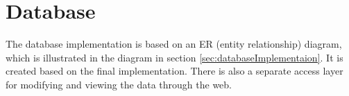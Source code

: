 \section{Database}
The database implementation is based on an ER (entity relationship) diagram, which is illustrated in the
diagram in section \ref{sec:databaseImplementaion}. It is created based on the 
final implementation. There is also a separate access layer for modifying and 
viewing the data through the web.

%
%

